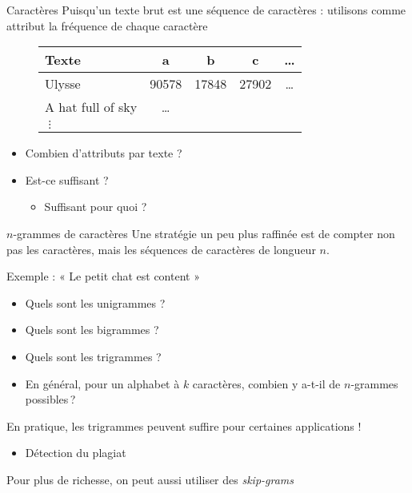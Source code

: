 \documentclass[../allslides.tex]{subfiles}
\begin{document}
\begin{frame}{Caractères}
	Puisqu'un texte brut est une séquence de caractères : utilisons comme attribut la fréquence de chaque caractère

	\begin{figure}
		\begin{tabular}{l*{4}{S[table-format = 4.0]}}
			\toprule
			{\textbf{Texte}}   & {\textbf{a}} & {\textbf{b}} & {\textbf{c}} & {\textbf{…}}\\
			\midrule
			Ulysse  & 90578 & 17848 & 27902 & {…}\\
			A hat full of sky  & {…}\\
			\(⋮\)\\
			\bottomrule
		\end{tabular}
	\end{figure}

	\pause

	\begin{itemize}
		\item Combien d'attributs par texte ?
		\item Est-ce suffisant ?
			\begin{itemize}
				\item<+-> Suffisant pour quoi ?
			\end{itemize}
	\end{itemize}
\end{frame}

\begin{frame}{\(n\)-grammes de caractères}
	Une stratégie un peu plus raffinée est de compter non pas les caractères, mais les séquences de caractères de longueur \(n\).

	Exemple : « Le petit chat est content »

	\begin{itemize}
		\item Quels sont les unigrammes ?
		\item Quels sont les bigrammes ?
		\item Quels sont les trigrammes ?
		\item En général, pour un alphabet à \(k\) caractères, combien y a-t-il de \(n\)-grammes possibles ?
	\end{itemize}

	En pratique, les trigrammes peuvent suffire pour certaines applications !
	\begin{itemize}
		\item Détection du plagiat
	\end{itemize}

	Pour plus de richesse, on peut aussi utiliser des \emph{skip-grams}
\end{frame}
\end{document}

